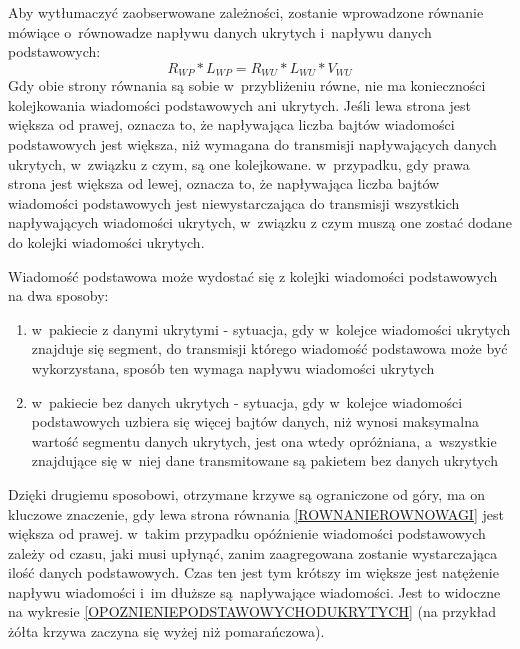 \documentclass[a4paper, twoside, 12pt]{report}
\begin{document}
            Aby wytłumaczyć zaobserwowane zależności, zostanie wprowadzone równanie
            mówiące o~równowadze napływu danych ukrytych i~napływu danych podstawowych:
            \begin{equation} \label{ROWNANIEROWNOWAGI}
            R_{WP} * L_{WP} = R_{WU} * L_{WU} * V_{WU}
            \end{equation}
            Gdy obie strony równania są sobie w~przybliżeniu równe, nie ma konieczności
            kolejkowania wiadomości podstawowych ani ukrytych. Jeśli lewa strona jest
            większa od prawej, oznacza to, że napływająca liczba bajtów wiadomości podstawowych
            jest większa, niż wymagana do transmisji napływających danych ukrytych,
            w~związku z czym, są one kolejkowane. w~przypadku, gdy prawa strona jest
            większa od lewej, oznacza to, że napływająca liczba bajtów wiadomości
            podstawowych jest niewystarczająca do transmisji wszystkich napływających
            wiadomości ukrytych, w~związku z czym muszą one zostać dodane do kolejki
            wiadomości ukrytych.

            Wiadomość podstawowa może wydostać się z kolejki wiadomości podstawowych
            na dwa sposoby:
            \begin{enumerate}
                \item w~pakiecie z danymi ukrytymi - sytuacja, gdy w~kolejce
                    wiadomości ukrytych znajduje się segment, do transmisji którego
                    wiadomość podstawowa może być wykorzystana, sposób ten wymaga
                    napływu wiadomości ukrytych
                \item w~pakiecie bez danych ukrytych - sytuacja, gdy w~kolejce wiadomości
                    podstawowych uzbiera się więcej bajtów danych, niż wynosi
                    maksymalna wartość segmentu danych ukrytych, jest ona wtedy
                    opróżniana, a~wszystkie znajdujące się w~niej dane transmitowane
                    są pakietem bez danych ukrytych
            \end{enumerate}

            Dzięki drugiemu sposobowi, otrzymane krzywe są ograniczone od góry,
            ma on kluczowe znaczenie, gdy lewa strona równania \ref{ROWNANIEROWNOWAGI} jest większa od prawej.
            w~takim przypadku
            opóźnienie wiadomości podstawowych zależy od czasu, jaki musi upłynąć,
            zanim zaagregowana zostanie wystarczająca ilość danych podstawowych.
            Czas ten jest tym krótszy im większe jest natężenie napływu wiadomości
            i~im dłuższe są napływające wiadomości. Jest to widoczne na wykresie
            \ref{OPOZNIENIEPODSTAWOWYCHODUKRYTYCH} (na przykład żółta krzywa zaczyna
            się wyżej niż pomarańczowa).
\end{document}

